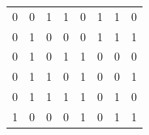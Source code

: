 \begin{center}
\begin{tabular}{|llll|llll|}
0                                                       & 0                                                      & 1                                                      & 1                                                       & 0                                                      & 1                                                      & 1                                                      & 0                                                       \\
0                                                       & 1                                                      & 0                                                      & 0                                                       & 0                                                      & 1                                                      & 1                                                      & 1                                                       \\
0                                                       & 1                                                      & 0                                                      & 1                                                       & 1                                                      & 0                                                      & 0                                                      & 0                                                       \\
0                                                       & 1                                                      & 1                                                      & 0                                                       & 1                                                      & 0                                                      & 0                                                      & 1                                                       \\
0                                                       & 1                                                      & 1                                                      & 1                                                       & 1                                                      & 0                                                      & 1                                                      & 0                                                       \\
1                                                       & 0                                                      & 0                                                      & 0                                                       & 1                                                      & 0                                                      & 1                                                      & 1                                                       \\

\end{tabular}
\end{center}
